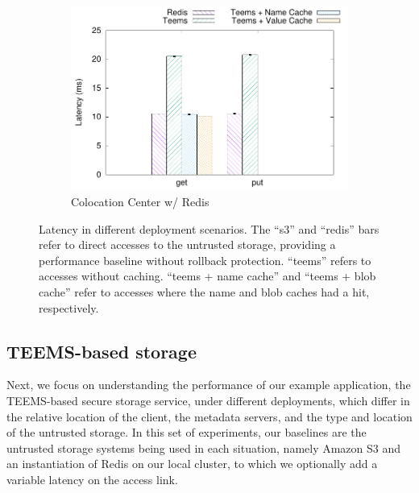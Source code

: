 \begin{figure}[t]
    \begin{subfigure}[t]{0.24 * 10cm}
        \centering
        \includegraphics[width=\linewidth]{teem_results/deployment/result/collocation_center}
        \caption{Colocation Center w/ Redis}\label{fig:coloc_redis}
    \end{subfigure}
    \caption{Latency in different deployment scenarios. The
    ``s3'' and ``redis'' bars refer to direct accesses to the
    untrusted storage, providing a performance baseline without
    rollback protection. ``teems'' refers to accesses without
    caching. ``teems + name cache'' and ``teems +
    blob cache'' refer to accesses where the name and blob
    caches had a hit, respectively.}
\end{figure}



\subsection{\ac{TEEMS}-based storage}\label{ssec:eval_deploy}
Next, we focus on understanding the performance of our example
application, the  \ac{TEEMS}-based secure storage service, under
different deployments, which differ in the relative location of
the client, the metadata servers, and the type and location of
the untrusted storage. In this set of experiments, our baselines
are the untrusted
storage systems being used in each situation, namely Amazon S3 and an
instantiation of Redis on our local cluster, to which we optionally
add a variable  latency on the
access link.

